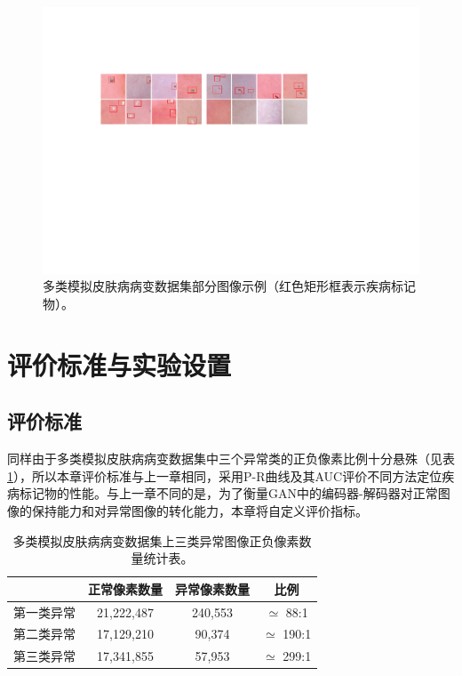 \begin{figure}[h]
	\centering
	\includegraphics[width=1.0\textwidth]{figure/multi_classes_simulated_skin.pdf}
	\caption[多类模拟皮肤病病变数据集部分图像示例]{多类模拟皮肤病病变数据集部分图像示例（红色矩形框表示疾病标记物）。}
	\label{fig:mul_classes_simulated_ds}
\end{figure}
\vspace{-0.7cm}
\section{评价标准与实验设置}
\subsection{评价标准}
同样由于多类模拟皮肤病病变数据集中三个异常类的正负像素比例十分悬殊（见表\ref{tab:multi_ds_pixel_freqs}），所以本章评价标准与上一章相同，采用P-R曲线及其AUC评价不同方法定位疾病标记物的性能。与上一章不同的是，为了衡量GAN中的编码器-解码器对正常图像的保持能力和对异常图像的转化能力，本章将自定义评价指标。
\begin{table}[h]
	\centering
	\caption[多类模拟皮肤病病变数据集上三类异常图像正负像素数量统计表]{多类模拟皮肤病病变数据集上三类异常图像正负像素数量统计表。}
	\label{tab:multi_ds_pixel_freqs}
	\begin{tabular}{c|c|c|c}
		\toprule[2pt]
		 & 正常像素数量 & 异常像素数量 & 比例 \\
		\midrule[2pt]
		第一类异常&  21,222,487 & 240,553 & $\simeq$ 88:1 \\ \hline
		第二类异常&  17,129,210 & 90,374 & $\simeq$ 190:1 \\ \hline
		第三类异常 & 17,341,855 & 57,953 & $\simeq$ 299:1 \\
		\bottomrule[2pt]
	\end{tabular}
\end{table}
\vspace{-0.7cm}
